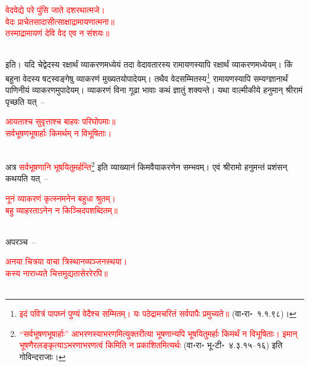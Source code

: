 \centering\textcolor{red}{वेदवेद्ये परे पुंसि जाते दशरथात्मजे। \nopagebreak\\
वेदः प्राचेतसादासीत्साक्षाद्रामायणात्मना॥\nopagebreak\\
तस्माद्रामायणं देवि वेद एव न संशयः॥}\nopagebreak\\
\\
\begin{sloppypar}\justifying\noindent इति। यदि चेद्वेदस्य रक्षार्थं व्याकरणमध्येयं तदा वेदावतारस्य रामायणस्यापि रक्षार्थं व्याकरणमध्येयम्। किं बहुना वेदस्य षट्स्वङ्गेषु व्याकरणं मुख्यतयोपादेयम्। तथैव वेद\-सम्मितस्य\footnote{\textcolor{red}{इदं पवित्रं पापघ्नं पुण्यं वेदैश्च सम्मितम्। यः पठेद्रामचरितं सर्वपापैः प्रमुच्यते॥} (वा॰रा॰~१.१.९८)।} रामायणस्यापि सम्यग्ज्ञानार्थं पाणिनीयं व्याकरणमुपादेयम्। व्याकरणं विना गूढा भावाः कथं ज्ञातुं शक्यन्ते। यथा वाल्मीकीये हनुमान् श्रीरामं पृच्छति यत्~–\end{sloppypar}
\centering\textcolor{red}{आयताश्च सुवृत्ताश्च बाहवः परिघोपमाः॥\nopagebreak\\
सर्वभूषणभूषार्हाः किमर्थम् न विभूषिताः।}\nopagebreak\\
\\
\begin{sloppypar}\justifying\noindent अत्र \textcolor{red}{सर्व\-भूषणानि भूषयितुमर्हन्ति}\footnote{\textcolor{red}{“सर्वभूषणभूषार्हाः” आभरणस्याभरणमित्युक्त\-रीत्या भूषणान्यपि भूषयितुमर्हाः किमर्थं न विभूषिताः। इमान् भूषणैरलङ्कृत्याऽभरणाभरणत्वं किमिति न प्रकाशितमित्यर्थः} (वा॰रा॰ भू॰टी॰~४.३.१५–१६) इति गोविन्द\-राजाः।}  इति व्याख्यानं किमवैयाकरणेन सम्भवम्। एवं श्रीरामो हनुमन्तं प्रशंसन् कथयति यत्~–\end{sloppypar}
\centering\textcolor{red}{नूनं व्याकरणं कृत्स्नमनेन बहुधा श्रुतम्।\nopagebreak\\
बहु व्याहरताऽनेन न किञ्चिदपशब्दितम्॥}\nopagebreak\\
\\
\begin{sloppypar}\justifying\noindent अपरञ्च~–\end{sloppypar}
\centering\textcolor{red}{अनया चित्रया वाचा त्रिस्थानव्यञ्जनस्थया।\nopagebreak\\
कस्य नाराध्यते चित्तमुद्यतासेररेरपि॥}\nopagebreak\\
\\
